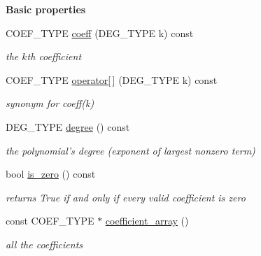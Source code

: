 \begin{Indent}\textbf{ Basic properties}\par
\begin{DoxyCompactItemize}
\item 
\mbox{\label{class_dense___univariate___integer___polynomial_add45ee2cac1598b8069d0375190461dc}} 
C\+O\+E\+F\+\_\+\+T\+Y\+PE \hyperlink{class_dense___univariate___integer___polynomial_add45ee2cac1598b8069d0375190461dc}{coeff} (D\+E\+G\+\_\+\+T\+Y\+PE k) const
\begin{DoxyCompactList}\small\item\em the $k$th coefficient \end{DoxyCompactList}\item 
\mbox{\label{class_dense___univariate___integer___polynomial_af39a736de8d5640ac943d358396f1f85}} 
C\+O\+E\+F\+\_\+\+T\+Y\+PE \hyperlink{class_dense___univariate___integer___polynomial_af39a736de8d5640ac943d358396f1f85}{operator\mbox{[}$\,$\mbox{]}} (D\+E\+G\+\_\+\+T\+Y\+PE k) const
\begin{DoxyCompactList}\small\item\em synonym for {\ttfamily coeff(k)} \end{DoxyCompactList}\item 
\mbox{\label{class_dense___univariate___integer___polynomial_a5099a83e73b6b86f310a9ef56ffd5689}} 
D\+E\+G\+\_\+\+T\+Y\+PE \hyperlink{class_dense___univariate___integer___polynomial_a5099a83e73b6b86f310a9ef56ffd5689}{degree} () const
\begin{DoxyCompactList}\small\item\em the polynomial's degree (exponent of largest nonzero term) \end{DoxyCompactList}\item 
\mbox{\label{class_dense___univariate___integer___polynomial_ac5251f81aaecea090443ed6cff755da4}} 
bool \hyperlink{class_dense___univariate___integer___polynomial_ac5251f81aaecea090443ed6cff755da4}{is\+\_\+zero} () const
\begin{DoxyCompactList}\small\item\em returns {\ttfamily True} if and only if every valid coefficient is zero \end{DoxyCompactList}\item 
\mbox{\label{class_dense___univariate___integer___polynomial_ae10c30e8f3b0702d6ec0c90b2feedb23}} 
const C\+O\+E\+F\+\_\+\+T\+Y\+PE $\ast$ \hyperlink{class_dense___univariate___integer___polynomial_ae10c30e8f3b0702d6ec0c90b2feedb23}{coefficient\+\_\+array} ()
\begin{DoxyCompactList}\small\item\em all the coefficients \end{DoxyCompactList}\end{DoxyCompactItemize}
\end{Indent}
